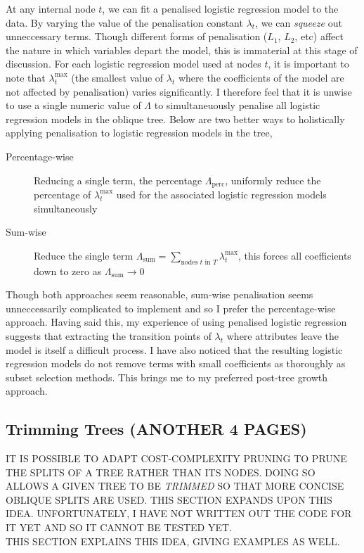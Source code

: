 At any internal node $t$, we can fit a penalised logistic regression model to the data. By varying the value of the penalisation constant $\lambda_t$, we can \emph{squeeze} out unneccessary terms. Though different forms of penalisation ($L_1$, $L_2$, etc) affect the nature in which variables depart the model, this is immaterial at this stage of discussion. For each logistic regression model used at nodes $t$, it is important to note that $\lambda_t^{\mbox{max}}$ (the smallest value of $\lambda_t$ where the coefficients of the model are not affected by penalisation) varies significantly. I therefore feel that it is unwise to use a single numeric value of $\Lambda$ to simultaneuously penalise all logistic regression models in the oblique tree. Below are two better ways to holistically applying penalisation to logistic regression models in the tree,
\begin{description}
\item[Percentage-wise] Reducing a single term, the percentage $\Lambda_{\mbox{perc}}$, uniformly reduce the percentage of $\lambda_t^{\mbox{max}}$ used for the associated logistic regression models simultaneously
\item[Sum-wise] Reduce the single term $\Lambda_{\mbox{sum}}=\sum_{\mbox{nodes }t\mbox{ in }T}\lambda_t^{\mbox{max}}$, this forces all coefficients down to zero as $\Lambda_{\mbox{sum}}\rightarrow 0$
\end{description}
Though both approaches seem reasonable, sum-wise penalisation seems unneccessarily complicated to implement and so I prefer the percentage-wise approach. Having said this, my experience of using penalised logistic regression suggests that extracting the transition points of $\lambda_t$ where attributes leave the model is itself a difficult process. I have also noticed that the resulting logistic regression models do not remove terms with small coefficients as thoroughly as subset selection methods. This brings me to my preferred post-tree growth approach.\\

\subsection{Trimming Trees (ANOTHER 4 PAGES)}
\noindent IT IS POSSIBLE TO ADAPT COST-COMPLEXITY PRUNING TO PRUNE THE SPLITS OF A TREE RATHER THAN ITS NODES. DOING SO ALLOWS A GIVEN TREE TO BE \emph{TRIMMED} SO THAT MORE CONCISE OBLIQUE SPLITS ARE USED. THIS SECTION EXPANDS UPON THIS IDEA. UNFORTUNATELY, I HAVE NOT WRITTEN OUT THE CODE FOR IT YET AND SO IT CANNOT BE TESTED YET.\\
\noindent THIS SECTION EXPLAINS THIS IDEA, GIVING EXAMPLES AS WELL.

